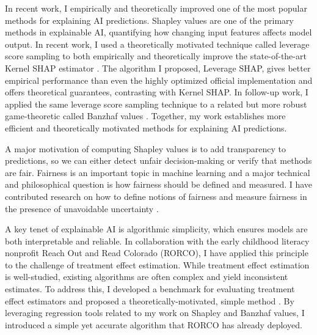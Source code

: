 \documentclass[11pt]{article}
\begin{document}
{In recent work, I empirically and theoretically improved one of the most popular methods for explaining AI predictions. Shapley values are one of the primary methods in explainable AI, quantifying how changing input features affects model output.
In recent work, I used a theoretically motivated technique called leverage score sampling to both empirically and theoretically improve the state-of-the-art Kernel SHAP estimator \cite{musco2024leverage}. The algorithm I proposed, Leverage SHAP, gives better empirical performance than even the highly optimized official implementation and offers theoretical guarantees, contrasting with Kernel SHAP. In follow-up work, I applied the same leverage score sampling technique to a related but more robust game-theoretic called Banzhaf values \cite{liu2024kernel}. Together, my work establishes more efficient and theoretically motivated methods for explaining AI predictions.

A major motivation of computing Shapley values is to add transparency to predictions, so we can either detect unfair decision-making or verify that methods are fair. Fairness is an important topic in machine learning and a major technical and philosophical question is how fairness should be defined and measured. I have contributed research on how to define notions of fairness \cite{rosenblatt2023counterfactual} and measure fairness in the presence of unavoidable uncertainty \cite{witter2024fairlyuncertain}.

A key tenet of explainable AI is algorithmic simplicity, which ensures models are both interpretable and reliable. In collaboration with the early childhood literacy nonprofit Reach Out and Read Colorado (RORCO), I have applied this principle to the challenge of treatment effect estimation. While treatment effect estimation is well-studied, existing algorithms are often complex and yield inconsistent estimates. To address this, I developed a benchmark for evaluating treatment effect estimators and proposed a theoretically-motivated, simple method \cite{witter2024benchmarking}. By leveraging regression tools related to my work on Shapley and Banzhaf values, I introduced a simple yet accurate algorithm that RORCO has already deployed.

}
\end{document}

